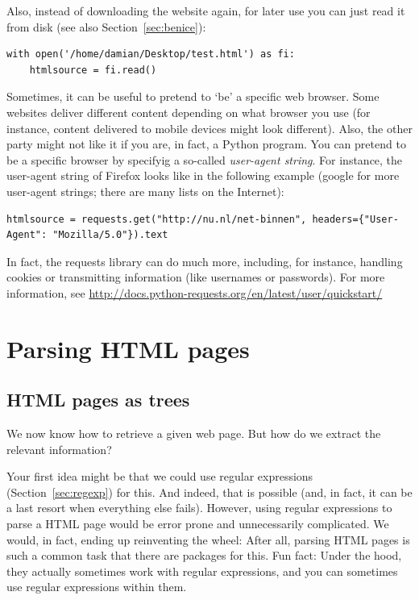 \documentclass[a4paper,12pt]{book}
\begin{document}
Also, instead of downloading the website again, for later use you can just read it from disk (see also Section~\ref{sec:benice}):

\begin{lstlisting}
with open('/home/damian/Desktop/test.html') as fi:
    htmlsource = fi.read()
\end{lstlisting}


Sometimes, it can be useful to pretend to `be' a specific web browser. Some websites deliver different content depending on what browser you use (for instance, content delivered to mobile devices might look different). Also, the other party might not like it if you are, in fact, a Python program.
You can pretend to be a specific browser by specifyig a so-called \emph{user-agent string}.
For instance, the user-agent string of Firefox looks like in the following example (google for more user-agent strings; there are many lists on the Internet):

\begin{lstlisting}
htmlsource = requests.get("http://nu.nl/net-binnen", headers={"User-Agent": "Mozilla/5.0"}).text
\end{lstlisting}

In fact, the requests library can do much more, including, for instance, handling cookies or transmitting information (like usernames or passwords). For more information, see \url{http://docs.python-requests.org/en/latest/user/quickstart/}



\section{Parsing HTML pages}
\label{parsing}
\subsection{HTML pages as trees}


We now know how to retrieve a given web page. But how do we extract the relevant information?

Your first idea might be that we could use regular expressions (Section~\ref{sec:regexp}) for this. And indeed, that is possible (and, in fact, it can be a last resort when everything else fails). However, using regular expressions to parse a HTML page would be error prone and unnecessarily complicated. We would, in fact, ending up reinventing the wheel: After all, parsing HTML pages is such a common task that there are packages for this. Fun fact: Under the hood, they actually sometimes work with regular expressions, and you can sometimes use regular expressions within them.
\end{document}
